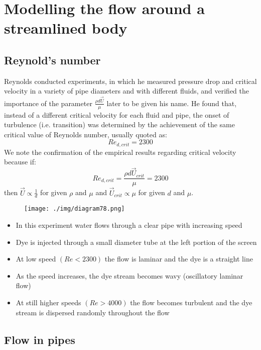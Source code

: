 \chapter{Modelling the flow around a streamlined body}
\section{Reynold's number}
Reynolds conducted experiments, in which he measured pressure drop and critical velocity in a variety of pipe diameters and with different fluids, and verified the importance of the parameter $\frac{\rho d \vec{U}}{\mu}$ later to be given his name. He found that, instead of a different critical velocity for each fluid and pipe, the onset of turbulence (i.e. transition) was determined by the achievement of the same critical value of Reynolds number, usually quoted as:
\begin{equation}
  Re_{d,crit} = 2300
\end{equation}
We note the confirmation of the empirical results regarding critical velocity because if:
\begin{equation}
  Re_{d,crit} = \frac{\rho d \vec{U}_{crit}}{\mu} = 2300
\end{equation}
then $\vec{U} \propto \frac{1}{d}$ for given $\rho$ and $\mu$ and $\vec{U}_{crit} \propto \mu$ for given $d$ and $\mu$.
\begin{figure}[H]
  \centering
  \texttt{[image: ./img/diagram78.png]}
  \caption{}
\end{figure}
\begin{itemize}[noitemsep]
  \item In this experiment water flows through a clear pipe with increasing speed
  \item Dye is injected through a small diameter tube at the left portion of the screen
  \item At low speed $ \left( Re < 2300 \right)$ the flow is laminar and the dye is a straight line
  \item As the speed increases, the dye stream becomes wavy (oscillatory laminar flow)
  \item At still higher speeds $\left(Re > 4000\right)$ the flow becomes turbulent and the dye stream is dispersed randomly throughout the flow
\end{itemize}
\section{Flow in pipes}
